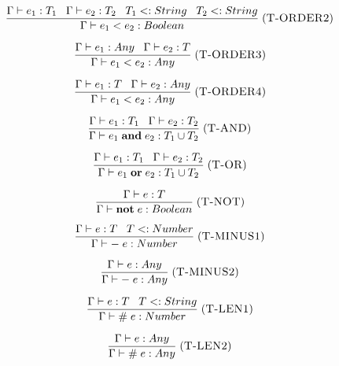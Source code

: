 \documentclass[12pt]{article}
\newcommand{\mylabel}[1]{\; (\textsc{#1})}
\newcommand{\subtype}{<:}
\newcommand{\kw}[1]{\mathbf{#1} \;}
\newcommand{\env}{\Gamma}
\begin{document}
\[
\frac{\env \vdash e_{1}:T_{1} \;\;\;
      \env \vdash e_{2}:T_{2} \;\;\;
      T_{1} \subtype String \;\;\;
      T_{2} \subtype String}
     {\env \vdash e_{1} < e_{2} : Boolean}
\mylabel{T-ORDER2}
\]

\[
\frac{\env \vdash e_{1}:Any \;\;\;
      \env \vdash e_{2}:T}
     {\env \vdash e_{1} < e_{2} : Any}
\mylabel{T-ORDER3}
\]

\[
\frac{\env \vdash e_{1}:T \;\;\;
      \env \vdash e_{2}:Any}
     {\env \vdash e_{1} < e_{2} : Any}
\mylabel{T-ORDER4}
\]

\[
\frac{\env \vdash e_{1}:T_{1} \;\;\;
      \env \vdash e_{2}:T_{2}}
     {\env \vdash e_{1} \; \kw{and} e_{2} : T_{1} \cup T_{2}}
\mylabel{T-AND}
\]

\[
\frac{\env \vdash e_{1}:T_{1} \;\;\;
      \env \vdash e_{2}:T_{2}}
     {\env \vdash e_{1} \; \kw{or} e_{2} : T_{1} \cup T_{2}}
\mylabel{T-OR}
\]

\[
\frac{\env \vdash e:T}
     {\env \vdash \kw{not} e : Boolean}
\mylabel{T-NOT}
\]

\[
\frac{\env \vdash e:T \;\;\;
      T \subtype Number}
     {\env \vdash - \; e : Number}
\mylabel{T-MINUS1}
\]

\[
\frac{\env \vdash e:Any}
     {\env \vdash - \; e : Any}
\mylabel{T-MINUS2}
\]

\[
\frac{\env \vdash e:T \;\;\;
      T \subtype String}
     {\env \vdash \# \; e : Number}
\mylabel{T-LEN1}
\]

\[
\frac{\env \vdash e:Any}
     {\env \vdash \# \; e : Any}
\mylabel{T-LEN2}
\]
\end{document}
